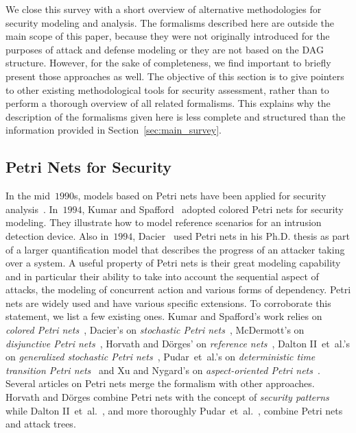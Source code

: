 \documentclass[a4paper]{article}
\begin{document}
We close this survey with a short overview of alternative methodologies for
security modeling and analysis.  The formalisms described here are outside the
main scope of this paper, because they  were not originally introduced for the
purposes of attack and defense  modeling or they are not based on the DAG
structure.  However, for the sake of completeness, we find important to  briefly
present those approaches as well.   The objective of this section is to give
pointers to other existing methodological tools for security assessment,  rather
than to perform a thorough overview of all related formalisms. This explains why
the description of the formalisms given here is less complete and structured
than the information provided in  Section~\ref{sec:main_survey}. 

\subsection{Petri Nets for Security}

In the mid~$1990$s, models based on Petri nets have been applied for security 
analysis~\cite{KuSp,Dacier1994}. In~$1994$, Kumar and Spafford~\cite{KuSp}
adopted colored Petri nets for  security  modeling. They illustrate how to model
reference scenarios for an intrusion  detection device. Also in~$1994$,
Dacier~\cite{Dacier1994} used Petri nets in  his  Ph.D. thesis as part of a
larger quantification model that describes the progress of an attacker taking
over a system. A useful property of Petri nets  is their great modeling
capability and in particular their ability to take into  account the sequential
aspect of attacks, the modeling of concurrent action and  various forms of
dependency. Petri nets are widely used and have various  specific extensions. To
corroborate this statement,  we list a few existing ones. Kumar and Spafford's
work relies on \emph{colored Petri nets}~\cite{KuSp}, Dacier's on
\emph{stochastic Petri nets}~\cite{Dacier1994}, McDermott's on \emph{disjunctive
Petri  nets}~\cite{McDe}, Horvath and D\"{o}rges' on \emph{reference
nets}~\cite{HoDo}, Dalton II~et~al.'s on \emph{generalized stochastic Petri 
nets}~\cite{DaMiCoRa}, Pudar~et~al.'s on \emph{deterministic time transition 
Petri nets}~\cite{PuMaLi} and Xu and Nygard's on \emph{aspect-oriented Petri 
nets}~\cite{XuNy}. Several articles on Petri nets merge the formalism with 
other approaches. Horvath and D\"{o}rges combine Petri nets with the concept of 
\emph{security patterns}~\cite{HoDo} while Dalton II~et~al.~\cite{DaMiCoRa}, and
more thoroughly Pudar~et~al.~\cite{PuMaLi}, combine Petri nets and attack 
trees. 
\end{document}
